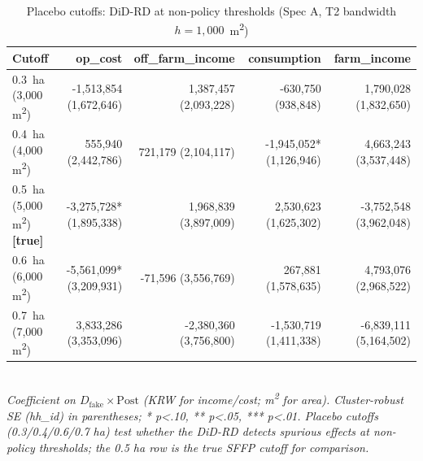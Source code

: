 \begin{table}[ht]
\centering
\caption{Placebo cutoffs: DiD-RD at non-policy thresholds (Spec A, T2 bandwidth $h=1{,}000$~m\textsuperscript{2})}
\label{tab:placebo-cutoffs}
\scriptsize
\setlength{\tabcolsep}{3pt}
\begin{tabular}{lrrrr}
\toprule
Cutoff & op\_cost & off\_farm\_income & consumption & farm\_income \\
\midrule
0.3~ha (3,000 m\textsuperscript{2}) & -1,513,854 (1,672,646) & 1,387,457 (2,093,228) & -630,750 (938,848) & 1,790,028 (1,832,650) \\
0.4~ha (4,000 m\textsuperscript{2}) & 555,940 (2,442,786) & 721,179 (2,104,117) & -1,945,052* (1,126,946) & 4,663,243 (3,537,448) \\
0.5~ha (5,000 m\textsuperscript{2}) \textbf{[true]} & -3,275,728* (1,895,338) & 1,968,839 (3,897,009) & 2,530,623 (1,625,302) & -3,752,548 (3,962,048) \\
0.6~ha (6,000 m\textsuperscript{2}) & -5,561,099* (3,209,931) & -71,596 (3,556,769) & 267,881 (1,578,635) & 4,793,076 (2,968,522) \\
0.7~ha (7,000 m\textsuperscript{2}) & 3,833,286 (3,353,096) & -2,380,360 (3,756,800) & -1,530,719 (1,411,338) & -6,839,111 (5,164,502) \\
\bottomrule
\end{tabular}
\\
\footnotesize\textit{Coefficient on $D_{\text{fake}} \times \text{Post}$ (KRW for income/cost; m\textsuperscript{2} for area). Cluster-robust SE (hh\_id) in parentheses; * p<.10, ** p<.05, *** p<.01. Placebo cutoffs (0.3/0.4/0.6/0.7 ha) test whether the DiD-RD detects spurious effects at non-policy thresholds; the 0.5 ha row is the true SFFP cutoff for comparison.}
\end{table}

